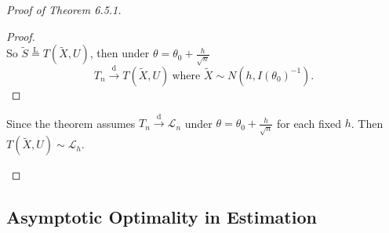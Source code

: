 \documentclass[a4paper]{article}
\begin{document}
\begin{proof}[Proof of Theorem 6.5.1]
\begin{itemize}[leftmargin=*]
\begin{proof}
\begin{equation*}
			\end{equation*}
			So $\tilde{S} \stackrel{\text{L}}{=} T(\tilde{X},U)$, then under $\theta = \theta_0 + \frac{h}{\sqrt{n}}$
			\begin{equation*}
				T_n \stackrel{\text{d}}{\longrightarrow} T(\tilde{X},U) \ \text{where } \tilde{X} \sim N\left(h,I(\theta_0)^{-1}\right).
			\end{equation*}
		\end{proof}
		Since the theorem assumes $T_n \stackrel{\text{d}}{\longrightarrow} \mathcal{L}_n$ under $\theta = \theta_0 + \frac{h}{\sqrt{n}}$ for each fixed $h$. Then $T(\tilde{X},U) \sim \mathcal{L}_h$.
	\end{itemize}
\end{proof}

\subsection{Asymptotic Optimality in Estimation}
\end{document}
